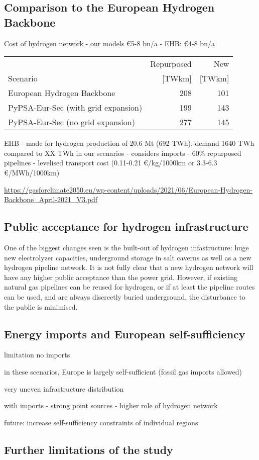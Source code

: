 \subsection*{Comparison to the European Hydrogen Backbone}

Cost of hydrogen network
- our models \euro 5-8 bn/a
- EHB: \euro 4-8 bn/a

\begin{tabular}{lrr}
    \toprule
     & Repurposed & New \\
     Scenario& [TWkm] & [TWkm] \\
    \midrule
    European Hydrogen Backbone & 208 & 101 \\
    PyPSA-Eur-Sec (with grid expansion) & 199 & 143 \\
    PyPSA-Eur-Sec (no grid expansion) & 277 & 145 \\
    \bottomrule
  \end{tabular}

EHB
- made for hydrogen production of 20.6 Mt (692 TWh), demand 1640 TWh compared to XX TWh in our scenarios
- considers imports
- 60\% repurposed pipelines
- levelised transport cost (0.11-0.21 \euro/kg/1000km or 3.3-6.3 \euro/MWh/1000km)


\url{https://gasforclimate2050.eu/wp-content/uploads/2021/06/European-Hydrogen-Backbone_April-2021_V3.pdf}

\subsection*{Public acceptance for hydrogen infrastructure}

One of the biggest changes seen is the built-out of hydrogen infastructure: huge new
electrolyzer capacities, underground storage in salt caverns as well
as a new hydrogen pipeline network. It is not fully clear that a new
hydrogen network will have any higher public acceptance than the power
grid. However, if existing natural gas pipelines can be reused for hydrogen,
or if at least the pipeline routes can be used, and are always discreetly buried underground, the disturbance to
the public is minimised.

\subsection*{Energy imports and European self-sufficiency}

limitation no imports

in these scenarios, Europe is largely self-sufficient (fossil gas imports allowed)

very uneven infrastructure distribution

with imports
- strong point sources
- higher role of hydrogen network

future: increase self-sufficiency constraints of individual regions

\subsection*{Further limitations of the study}

